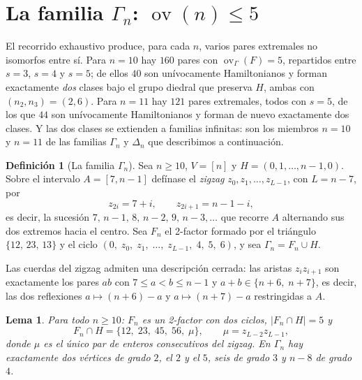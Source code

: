 \documentclass[11pt,a4paper]{article}
\newtheorem{lema}[teorema]{Lema}
\theoremstyle{definition}
\newtheorem{definicion}[teorema]{Definición}
\theoremstyle{remark}
\newcommand{\ov}{\operatorname{ov}}
\begin{document}
\section{La familia \texorpdfstring{$\Gamma_n$}{Gamma n}: \texorpdfstring{$\ov(n)\le5$}{ov(n) <= 5}}\label{sec:familia}

El recorrido exhaustivo produce, para cada $n$, varios pares extremales no isomorfos entre sí. Para $n=10$ hay $160$ pares con $\ov_\Gamma(F)=5$, repartidos entre $s=3$, $s=4$ y $s=5$; de ellos $40$ son unívocamente Hamiltonianos y forman exactamente \emph{dos} clases bajo el grupo diedral que preserva $H$, ambas con $(n_2,n_3)=(2,6)$. Para $n=11$ hay $121$ pares extremales, todos con $s=5$, de los que $44$ son unívocamente Hamiltonianos y forman de nuevo exactamente dos clases. Y las dos clases se extienden a familias infinitas: son los miembros $n=10$ y $n=11$ de las familias $\Gamma_n$ y $\Delta_n$ que describimos a continuación.

\begin{definicion}[La familia $\Gamma_n$]\label{def:gamma}
Sea $n\ge10$, $V=[n]$ y $H=(0,1,\dots,n-1,0)$. Sobre el intervalo $A=[7,n-1]$ defínase el \emph{zigzag} $z_0,z_1,\dots,z_{L-1}$, con $L=n-7$, por
\[
z_{2i}=7+i,\qquad z_{2i+1}=n-1-i ,
\]
es decir, la sucesión $7,\,n-1,\,8,\,n-2,\,9,\,n-3,\dots$ que recorre $A$ alternando sus dos extremos hacia el centro. Sea $F_n$ el 2-factor formado por el triángulo $\{12,\,23,\,13\}$ y el ciclo $(0,\;z_0,\;z_1,\;\dots,\;z_{L-1},\;4,\;5,\;6)$, y sea $\Gamma_n=F_n\cup H$.
\end{definicion}

Las cuerdas del zigzag admiten una descripción cerrada: las aristas $z_iz_{i+1}$ son exactamente los pares $ab$ con $7\le a<b\le n-1$ y $a+b\in\{n+6,\;n+7\}$, es decir, las dos reflexiones $a\mapsto(n+6)-a$ y $a\mapsto(n+7)-a$ restringidas a $A$.

\begin{lema}\label{lem:gammabasico}
Para todo $n\ge10$: $F_n$ es un 2-factor con dos ciclos, $|F_n\cap H|=5$ y
\[
F_n\cap H=\{12,\;23,\;45,\;56,\;\mu\},\qquad \mu=z_{L-2}z_{L-1},
\]
donde $\mu$ es el único par de enteros consecutivos del zigzag. En $\Gamma_n$ hay exactamente dos vértices de grado $2$, el $2$ y el $5$, seis de grado $3$ y $n-8$ de grado $4$.
\end{lema}
\end{document}
